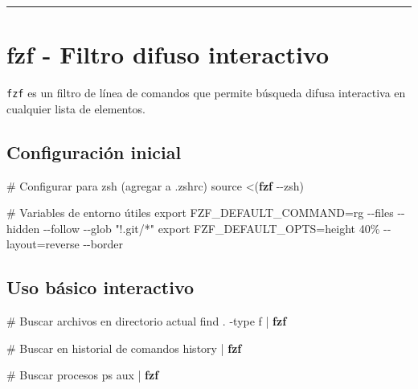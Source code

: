 \documentclass[
  11pt,
  letterpaper,
  oneside,
  openany]{scrbook}
\newenvironment{Shaded}{}{}
\newcommand{\AttributeTok}[1]{\textcolor[rgb]{0.84,0.23,0.29}{#1}}
\newcommand{\BuiltInTok}[1]{\textcolor[rgb]{0.84,0.23,0.29}{#1}}
\newcommand{\CommentTok}[1]{\textcolor[rgb]{0.42,0.45,0.49}{#1}}
\newcommand{\ExtensionTok}[1]{\textcolor[rgb]{0.84,0.23,0.29}{\textbf{#1}}}
\newcommand{\FunctionTok}[1]{\textcolor[rgb]{0.44,0.26,0.76}{#1}}
\newcommand{\KeywordTok}[1]{\textcolor[rgb]{0.84,0.23,0.29}{#1}}
\newcommand{\NormalTok}[1]{\textcolor[rgb]{0.14,0.16,0.18}{#1}}
\newcommand{\OperatorTok}[1]{\textcolor[rgb]{0.14,0.16,0.18}{#1}}
\newcommand{\StringTok}[1]{\textcolor[rgb]{0.01,0.18,0.38}{#1}}
\newcommand{\VariableTok}[1]{\textcolor[rgb]{0.89,0.38,0.04}{#1}}
\begin{document}
\begin{center}\rule{0.5\linewidth}{0.5pt}\end{center}

\section{fzf - Filtro difuso interactivo}\label{sec-fzf}

\texttt{fzf} es un filtro de línea de comandos que permite búsqueda
difusa interactiva en cualquier lista de elementos.

\subsection{Configuración inicial}\label{configuraciuxf3n-inicial-1}

\begin{Shaded}
\begin{Highlighting}[]
\CommentTok{\# Configurar para zsh (agregar a .zshrc)}
\BuiltInTok{source} \OperatorTok{\textless{}(}\ExtensionTok{fzf} \AttributeTok{{-}{-}zsh}\OperatorTok{)}

\CommentTok{\# Variables de entorno útiles}
\BuiltInTok{export} \VariableTok{FZF\_DEFAULT\_COMMAND}\OperatorTok{=}\StringTok{\textquotesingle{}rg {-}{-}files {-}{-}hidden {-}{-}follow {-}{-}glob "!.git/*"\textquotesingle{}}
\BuiltInTok{export} \VariableTok{FZF\_DEFAULT\_OPTS}\OperatorTok{=}\StringTok{\textquotesingle{}{-}{-}height 40\% {-}{-}layout=reverse {-}{-}border\textquotesingle{}}
\end{Highlighting}
\end{Shaded}

\subsection{Uso básico interactivo}\label{uso-buxe1sico-interactivo}

\begin{Shaded}
\begin{Highlighting}[]
\CommentTok{\# Buscar archivos en directorio actual}
\FunctionTok{find}\NormalTok{ . }\AttributeTok{{-}type}\NormalTok{ f }\KeywordTok{|} \ExtensionTok{fzf}

\CommentTok{\# Buscar en historial de comandos}
\BuiltInTok{history} \KeywordTok{|} \ExtensionTok{fzf}

\CommentTok{\# Buscar procesos}
\FunctionTok{ps}\NormalTok{ aux }\KeywordTok{|} \ExtensionTok{fzf}
\end{Highlighting}
\end{Shaded}
\end{document}
